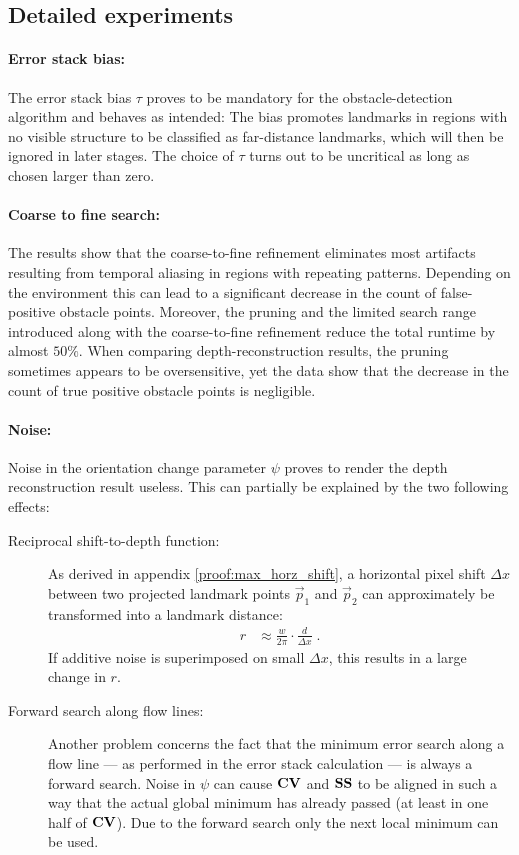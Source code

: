 \subsection{Detailed experiments}

\paragraph{Error stack bias:} The error stack bias $\tau$ proves to be mandatory for the obstacle-detection algorithm and behaves as intended: The bias promotes landmarks in regions with no visible structure to be classified as far-distance landmarks, which will then be ignored in later stages. The choice of $\tau$ turns out to be uncritical as long as chosen larger than zero.

\paragraph{Coarse to fine search:} The results show that the coarse-to-fine refinement eliminates most artifacts resulting from temporal aliasing in regions with repeating patterns. Depending on the environment this can lead to a significant decrease in the count of false-positive obstacle points. Moreover, the pruning and the limited search range introduced along with the coarse-to-fine refinement reduce the total runtime by almost $50\%$. When comparing depth-reconstruction results, the pruning sometimes appears to be oversensitive, yet the data show that the decrease in the count of true positive obstacle points is negligible.

\paragraph{Noise:} Noise in the orientation change parameter $\psi$ proves to render the depth reconstruction result useless. This can partially be explained by the two following effects:
\begin{description}
\item[Reciprocal shift-to-depth function:] As derived in appendix \ref{proof:max_horz_shift}, a horizontal pixel shift $\Delta x$ between two projected landmark points $\vec p_1$ and $\vec p_2$ can approximately be transformed into a landmark distance:
\begin{align*}
  r &\approx \frac{w}{2 \pi} \cdot \frac{d}{\Delta x} \; .
\end{align*}
If additive noise is superimposed on small $\Delta x$, this results in a large change in $r$.
\item[Forward search along flow lines:] Another problem concerns the fact that the minimum error search along a flow line --- as performed in the error stack calculation --- is always a forward search. Noise in $\psi$ can cause $\mathbf{CV}$ and $\mathbf{SS}$ to be aligned in such a way that the actual global minimum has already passed (at least in one half of $\mathbf{CV}$). Due to the forward search only the next local minimum can be used.
\end{description}

